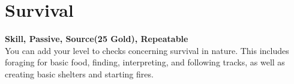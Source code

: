 \section{Survival}\label{sec:survival}
\textbf{Skill, Passive, Source(25 Gold), Repeatable}\\
You can add your level to checks concerning survival in nature. This includes foraging for basic food, finding, interpreting, and following tracks, as well as creating basic shelters and starting fires.